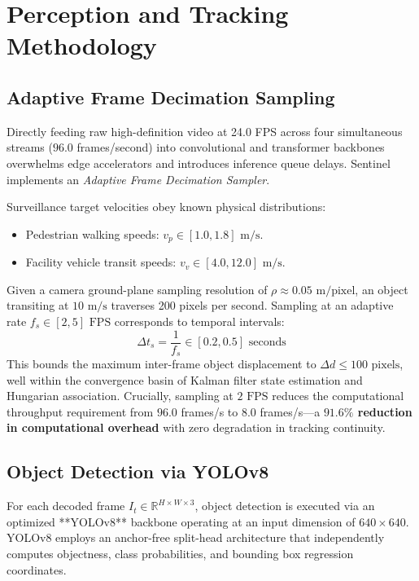 \documentclass[12pt,a4paper]{article}
\begin{document}
\section{Perception and Tracking Methodology}

\subsection{Adaptive Frame Decimation Sampling}
Directly feeding raw high-definition video at 24.0 FPS across four simultaneous streams ($96.0$ frames/second) into convolutional and transformer backbones overwhelms edge accelerators and introduces inference queue delays. Sentinel implements an \textit{Adaptive Frame Decimation Sampler}.

Surveillance target velocities obey known physical distributions:
\begin{itemize}
    \item Pedestrian walking speeds: $v_p \in [1.0, 1.8]\text{ m/s}$.
    \item Facility vehicle transit speeds: $v_v \in [4.0, 12.0]\text{ m/s}$.
\end{itemize}

Given a camera ground-plane sampling resolution of $\rho \approx 0.05\text{ m/pixel}$, an object transiting at $10\text{ m/s}$ traverses 200 pixels per second. Sampling at an adaptive rate $f_s \in [2, 5]\text{ FPS}$ corresponds to temporal intervals:
\begin{equation}
\Delta t_s = \frac{1}{f_s} \in [0.2, 0.5]\text{ seconds}
\end{equation}
This bounds the maximum inter-frame object displacement to $\Delta d \le 100\text{ pixels}$, well within the convergence basin of Kalman filter state estimation and Hungarian association. Crucially, sampling at $2\text{ FPS}$ reduces the computational throughput requirement from $96.0$ frames/s to $8.0$ frames/s---a \textbf{$91.6\%$ reduction in computational overhead} with zero degradation in tracking continuity.

\subsection{Object Detection via YOLOv8}
For each decoded frame $I_t \in \mathbb{R}^{H \times W \times 3}$, object detection is executed via an optimized **YOLOv8** backbone operating at an input dimension of $640 \times 640$. YOLOv8 employs an anchor-free split-head architecture that independently computes objectness, class probabilities, and bounding box regression coordinates.
\end{document}
